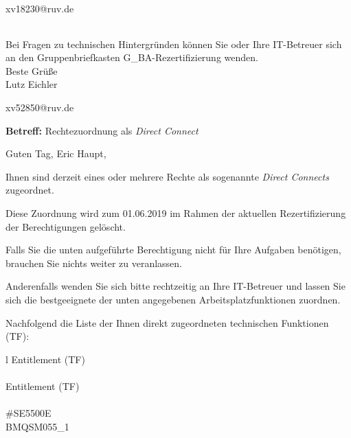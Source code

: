 \documentclass[a4paper,landscape,12pt]{letter}
\begin{document}
\begin{letter}{xv18230@ruv.de\hfill \break}
\begin{tiny}
\begin{longtable}{|p{35mm}|p{15mm}|p{25mm}|p{10mm}|p{40mm}|p{50mm}|p{50mm}|}
\hline
		\end{longtable}
		\end{tiny}
	
\begin{minipage}{\textwidth}
			Bei Fragen zu technischen Hintergründen können Sie 
			oder Ihre IT-Betreuer sich an den Gruppenbriefkasten 
			G\_BA-Rezertifizierung
			wenden.\\
			\linebreak
			Beste Grüße\\
			Lutz Eichler
	\end{minipage}
	\end{letter}
	
\begin{letter}{xv52850@ruv.de\hfill \break}
\begin{normalsize}
	\opening{\textbf{Betreff:} Rechtezuordnung als \emph{Direct Connect}}
	\begin{normalsize} \hfill
	\end{normalsize}

	\begin{normalsize}
		Guten Tag, 
	Eric Haupt, \hfill \break
	\end{normalsize}
	\end{normalsize}
	
\begin{normalsize}
	Ihnen sind derzeit eines oder mehrere Rechte als sogenannte \emph{Direct Connects} zugeordnet.
	
	Diese Zuordnung wird zum 01.06.2019 im Rahmen der aktuellen Rezertifizierung der Berechtigungen gelöscht.
	
	Falls Sie die unten aufgeführte Berechtigung nicht für Ihre Aufgaben benötigen, 
	brauchen Sie nichts weiter zu veranlassen.
	
	Anderenfalls wenden Sie sich bitte rechtzeitig an Ihre IT-Betreuer 
	und lassen Sie sich die bestgeeignete der unten angegebenen Arbeitsplatzfunktionen zuordnen.
	\end{normalsize}
	
\begin{normalsize}
	Nachfolgend die Liste der Ihnen direkt zugeordneten technischen Funktionen (TF):

	\begin{longtable}{l}
		Entitlement (TF) \\ \hline
		\endfirsthead
		\\\hline
		Entitlement (TF) \\ \hline
		\endhead %
		\multicolumn{1}{r@{}}{Fortsetzung \ldots}\\
		\endfoot
		\hline
		\endlastfoot
	\#SE5500E\\BMQSM055\_1\\
	\end{longtable}
	\end{normalsize}
	

\end{letter}
\end{document}
